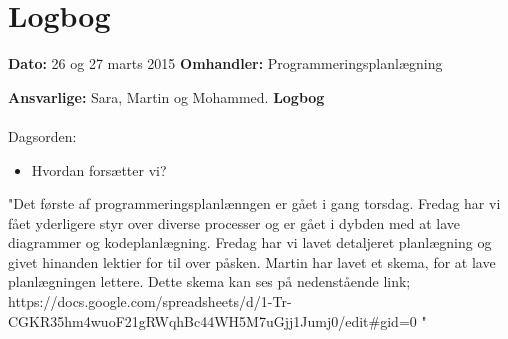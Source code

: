 \chapter{Logbog}

\textbf{Dato:} 26 og 27 marts 2015 
\textbf{Omhandler:} Programmeringsplanlægning

\textbf{Ansvarlige:} Sara, Martin og Mohammed. 
\textbf{Logbog}
\\
\\
Dagsorden:
\begin{itemize}
	\item Hvordan forsætter vi?
\end{itemize}


"Det første af programmeringsplanlænngen er gået i gang torsdag. Fredag har vi fået yderligere styr over diverse processer og er gået i dybden med at lave diagrammer og kodeplanlægning. 
Fredag har vi lavet detaljeret planlægning og givet hinanden lektier for til over påsken. Martin har lavet et skema, for at lave planlægningen lettere. Dette skema kan ses på nedenstående link; 
https://docs.google.com/spreadsheets/d/1-Tr-CGKR35hm4wuoF21gRWqhBc44WH5M7uGjj1Jumj0/edit#gid=0
"